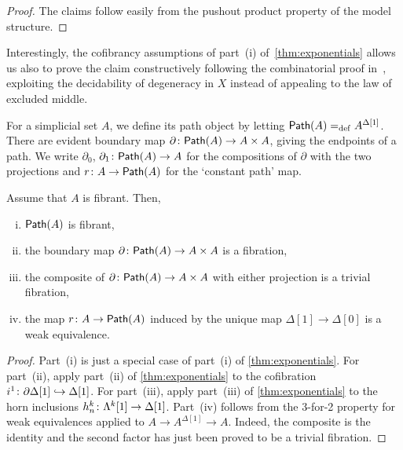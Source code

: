 \documentclass[reqno,10pt,a4paper,oneside,draft]{amsart}
\begin{document}
\begin{proof} The claims follow easily from the pushout product property of the model structure.
\end{proof}
 
Interestingly, the cofibrancy assumptions of part~(i) of~\cref{thm:exponentials} allows
us also to prove the claim constructively following the combinatorial proof in~\cite{MayJP:simoat}, exploiting the decidability of degeneracy in $X$ instead of appealing to the law of excluded middle.




For a simplicial set $A$, we define its path object by letting $\mathsf{Path}(A) =_{\operatorname{def}} A^{\Delta[1]}$. 
There are evident boundary map $\partial \colon \mathsf{Path}(A) \to A \times A$, giving
the endpoints of a path. We write $\partial_0$, $\partial_1 \colon \mathsf{Path}(A) \to A$ for the compositions of $\partial$
with the two projections and $r \colon A \to \mathsf{Path}(A)$ for the `constant path' map.



\begin{proposition} \label{thm:id-types-for-types}
Assume that $A$ is fibrant. Then,
\begin{enumerate}[(i)] 
\item $\mathsf{Path}(A)$ is fibrant,
\item the boundary map $\partial  \colon \mathsf{Path}(A) \rightarrow A \times A$ is a fibration,
\item the composite of $\partial \colon \mathsf{Path}(A) \rightarrow A \times A$ with either projection is a trivial fibration,
\item the map $r \colon A \rightarrow \mathsf{Path}(A)$ induced by the unique map $\Delta[1] \rightarrow \Delta[0]$ is a weak equivalence.
\end{enumerate}
\end{proposition} 

\begin{proof}
Part~(i) is just a special case of part~(i) of \cref{thm:exponentials}. For part~(ii), apply part~(ii) of \cref{thm:exponentials} to the cofibration $i^1 \colon \partial \Delta[1]  \hookrightarrow \Delta[1]$. For part~(iii), apply part~(iii) of \cref{thm:exponentials} to the horn inclusions $h^k_n \colon \Lambda^k[1]  \rightarrow \Delta[1]$. Part~(iv) follows from the 3-for-2 property for weak equivalences applied to $A \rightarrow A^{\Delta[1]} \rightarrow A$. Indeed, the
composite is the identity and the second factor has just been proved to be a trivial fibration.
\end{proof}
\end{document}
